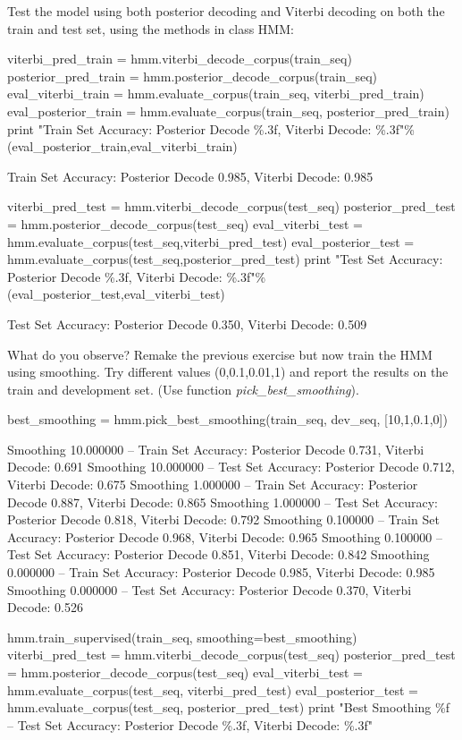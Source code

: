 \begin{exercise}
Test the model using both posterior decoding and Viterbi decoding on
both the train and test set, using the methods in class HMM:
\begin{python}
viterbi_pred_train = hmm.viterbi_decode_corpus(train_seq)
posterior_pred_train = hmm.posterior_decode_corpus(train_seq)
eval_viterbi_train =   hmm.evaluate_corpus(train_seq, viterbi_pred_train)
eval_posterior_train =  hmm.evaluate_corpus(train_seq, posterior_pred_train)
print "Train Set Accuracy: Posterior Decode \%.3f, Viterbi Decode: \%.3f"\%(eval_posterior_train,eval_viterbi_train)

Train Set Accuracy: Posterior Decode 0.985, Viterbi Decode: 0.985

viterbi_pred_test = hmm.viterbi_decode_corpus(test_seq)
posterior_pred_test = hmm.posterior_decode_corpus(test_seq)
eval_viterbi_test =   hmm.evaluate_corpus(test_seq,viterbi_pred_test)
eval_posterior_test = hmm.evaluate_corpus(test_seq,posterior_pred_test)
print "Test Set Accuracy: Posterior Decode \%.3f, Viterbi Decode: \%.3f"\%(eval_posterior_test,eval_viterbi_test)

Test Set Accuracy: Posterior Decode 0.350, Viterbi Decode: 0.509
\end{python}
What do you observe? Remake the previous exercise but now train the HMM
using smoothing. Try different values (0,0.1,0.01,1) and report the results on the
train and development set. (Use function
\emph{pick\_best\_smoothing}).


\begin{python}
best_smoothing = hmm.pick_best_smoothing(train_seq, dev_seq, [10,1,0.1,0])

Smoothing 10.000000 --  Train Set Accuracy: Posterior Decode 0.731, Viterbi Decode: 0.691
Smoothing 10.000000 -- Test Set Accuracy: Posterior Decode 0.712, Viterbi Decode: 0.675
Smoothing 1.000000 --  Train Set Accuracy: Posterior Decode 0.887, Viterbi Decode: 0.865
Smoothing 1.000000 -- Test Set Accuracy: Posterior Decode 0.818, Viterbi Decode: 0.792
Smoothing 0.100000 --  Train Set Accuracy: Posterior Decode 0.968, Viterbi Decode: 0.965
Smoothing 0.100000 -- Test Set Accuracy: Posterior Decode 0.851, Viterbi Decode: 0.842
Smoothing 0.000000 --  Train Set Accuracy: Posterior Decode 0.985, Viterbi Decode: 0.985
Smoothing 0.000000 -- Test Set Accuracy: Posterior Decode 0.370, Viterbi Decode: 0.526

hmm.train_supervised(train_seq, smoothing=best_smoothing)
viterbi_pred_test = hmm.viterbi_decode_corpus(test_seq)
posterior_pred_test = hmm.posterior_decode_corpus(test_seq)
eval_viterbi_test =   hmm.evaluate_corpus(test_seq, viterbi_pred_test)
eval_posterior_test = hmm.evaluate_corpus(test_seq, posterior_pred_test)
print "Best Smoothing \%f --  Test Set Accuracy: Posterior Decode \%.3f, Viterbi Decode: \%.3f"%


\end{python}
\end{exercise}
